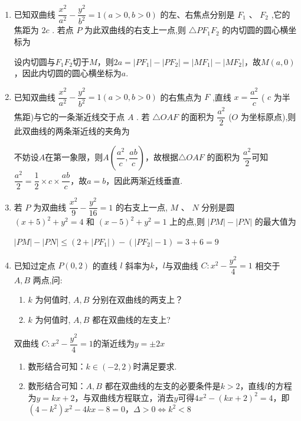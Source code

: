 \begin{enumerate}
    \item 已知双曲线 $\dfrac{{x}^{2}}{{a}^{2}} - \dfrac{{y}^{2}}{{b}^{2}} = 1\left( {a > 0,b > 0}\right)$ 的左、右焦点分别是 ${F}_{1}\text{ 、 }{F}_{2}$ ,它的焦距为 ${2c}$ . 若点 $P$ 为此双曲线的右支上一点,则 $\bigtriangleup P{F}_{1}{F}_{2}$ 的内切圆的圆心横坐标为
    \begin{jieda}
        设内切圆与$F_1F_2$切于$M$，则$2a = |PF_1| - |PF_2| = |MF_1| - |MF_2|$，故$M(a, 0)$，因此内切圆的圆心横坐标为$a$.
    \end{jieda}
    
    \item 已知双曲线 $\dfrac{{x}^{2}}{{a}^{2}} - \dfrac{{y}^{2}}{{b}^{2}} = 1\left( {a > 0,b > 0}\right)$ 的右焦点为 $F$ ,直线 $x = \dfrac{{a}^{2}}{c}$ ( $c$ 为半焦距)与它的一条渐近线交于点 $A$ . 若 $\bigtriangleup {OAF}$ 的面积为 $\dfrac{{a}^{2}}{2}$ ($O$ 为坐标原点),则此双曲线的两条渐近线的夹角为
    \begin{jieda}
        不妨设$A$在第一象限，则$A\left(\dfrac{a^2}{c}, \dfrac{ab}{c}\right)$，故根据$\bigtriangleup {OAF}$ 的面积为 $\dfrac{{a}^{2}}{2}$可知$\dfrac{a^2}{2} = \dfrac{1}{2} \times c \times \dfrac{ab}{c}$，故$a = b$，因此两渐近线垂直.
    \end{jieda}
    
    \item 若 $P$ 为双曲线 $\dfrac{{x}^{2}}{9} - \dfrac{{y}^{2}}{16} = 1$ 的右支上一点, $M\text{ 、 }N$ 分别是圆 ${\left( x + 5\right) }^{2} + {y}^{2} = 4$ 和 ${\left( x - 5\right) }^{2} + {y}^{2} = 1$ 上的点,则 $\left| {PM}\right|  - \left| {PN}\right|$ 的最大值为
    \begin{jieda}
        $\left| {PM}\right|  - \left| {PN}\right| \leq (2+|PF_1|) - (|PF_2| - 1) = 3+6 = 9$
    \end{jieda}
    
    \item 已知过定点 $P\left( {0,2}\right)$ 的直线 $l$ 斜率为$k$，$l$与双曲线 $C : {x}^{2} - \dfrac{{y}^{2}}{4} = 1$ 相交于 $A,B$ 两点,问:
    \begin{enumerate}
        \item $k$ 为何值时, $A,B$ 分别在双曲线的两支上？
        \item $k$ 为何值时, $A,B$ 都在双曲线的左支上?
    \end{enumerate}
    \begin{jieda}
        双曲线 $C : {x}^{2} - \dfrac{{y}^{2}}{4} = 1$的渐近线为$y = \pm 2x$
        \begin{enumerate}
            \item 数形结合可知：$k \in (-2,2)$时满足要求.
            \item 数形结合可知：$A,B$ 都在双曲线的左支的必要条件是$k > 2$，直线$l$的方程为$y = kx + 2$，与双曲线方程联立，消去$y$可得$4x^2 - (kx+2)^2 = 4$，即$(4-k^2)x^2-4kx - 8 = 0$，$\Delta > 0 \Longleftrightarrow k^2 < 8$
            

\end{enumerate}
\end{jieda}
\end{enumerate}
